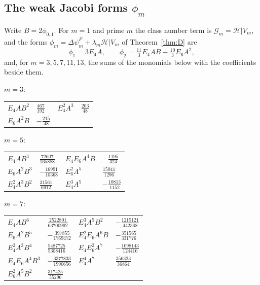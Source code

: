 \documentclass[11pt]{amsart}
\theoremstyle{definition}
\newcommand{\Hc}{\mathcal{H}}
\begin{document}
\subsection*{The weak Jacobi forms \texorpdfstring{$\phi_m$}{phi\_m}}
Write $B=2\phi_{0,1}$. For $m=1$ and prime $m$ the class number term is $\mathcal G_m=\Hc|V_m$, and the forms $\phi_m=\Delta\psi^F_m+\lambda_m\Hc|V_m$ of Theorem~\ref{thm:D} are
\[
\phi_1=3E_4A,\qquad \phi_2=\tfrac{11}{3}E_4AB-\tfrac{10}{3}E_6A^2,
\]
and, for $m=3,5,7,11,13$, the sums of the monomials below with the coefficients beside them.

\medskip
\noindent$m=3$:\nopagebreak\\[2pt]
{\small\begin{tabular}{@{}l@{\ \ }l@{\qquad}l@{\ \ }l@{}}
$E_4 A B^{2}$ & $\tfrac{467}{192}$ & $E_4^{2} A^{3}$ & $\tfrac{203}{48}$ \\
$E_6 A^{2} B$ & $-\tfrac{215}{48}$ & & \\
\end{tabular}}\par\medskip
\noindent$m=5$:\nopagebreak\\[2pt]
{\small\begin{tabular}{@{}l@{\ \ }l@{\qquad}l@{\ \ }l@{}}
$E_4 A B^{4}$ & $\tfrac{72607}{165888}$ & $E_4 E_6 A^{4} B$ & $-\tfrac{1195}{324}$ \\
$E_6 A^{2} B^{3}$ & $-\tfrac{16991}{10368}$ & $E_6^{2} A^{5}$ & $\tfrac{15041}{1296}$ \\
$E_4^{2} A^{3} B^{2}$ & $\tfrac{31561}{6912}$ & $E_4^{3} A^{5}$ & $-\tfrac{10813}{1152}$ \\
\end{tabular}}\par\medskip
\noindent$m=7$:\nopagebreak\\[2pt]
{\small\begin{tabular}{@{}l@{\ \ }l@{\qquad}l@{\ \ }l@{}}
$E_4 A B^{6}$ & $\tfrac{2522801}{63700992}$ & $E_4^{3} A^{5} B^{2}$ & $-\tfrac{1215121}{442368}$ \\
$E_6 A^{2} B^{5}$ & $-\tfrac{397855}{1769472}$ & $E_4^{2} E_6 A^{6} B$ & $-\tfrac{351565}{331776}$ \\
$E_4^{2} A^{3} B^{4}$ & $\tfrac{5487725}{5308416}$ & $E_4 E_6^{2} A^{7}$ & $-\tfrac{1098143}{124416}$ \\
$E_4 E_6 A^{4} B^{3}$ & $-\tfrac{3377833}{1990656}$ & $E_4^{4} A^{7}$ & $\tfrac{356323}{36864}$ \\
$E_6^{2} A^{5} B^{2}$ & $\tfrac{317425}{55296}$ & & \\
\end{tabular}}\par\medskip
\end{document}
